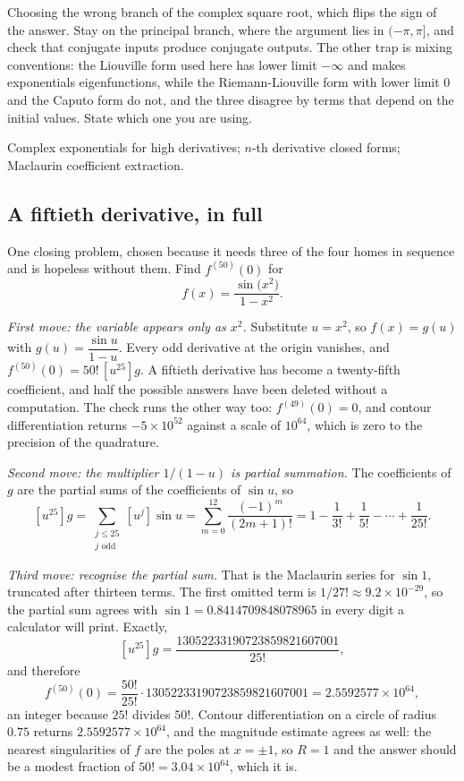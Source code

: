 \begin{trap}
Choosing the wrong branch of the complex square root, which flips the sign of the answer. Stay on the principal branch, where the argument lies in $(-\pi,\pi]$, and check that conjugate inputs produce conjugate outputs. The other trap is mixing conventions: the Liouville form used here has lower limit $-\infty$ and makes exponentials eigenfunctions, while the Riemann-Liouville form with lower limit $0$ and the Caputo form do not, and the three disagree by terms that depend on the initial values. State which one you are using.
\end{trap}

\begin{seealsob}Complex exponentials for high derivatives; $n$-th derivative closed forms; Maclaurin coefficient extraction.\end{seealsob}

\subsection{A fiftieth derivative, in full}

One closing problem, chosen because it needs three of the four homes in sequence and is hopeless without them. Find $f^{(50)}(0)$ for
\[
f(x)=\frac{\sin\bigl(x^{2}\bigr)}{1-x^{2}} .
\]

\emph{First move: the variable appears only as $x^{2}$.} Substitute $u=x^{2}$, so $f(x)=g(u)$ with $g(u)=\dfrac{\sin u}{1-u}$. Every odd derivative at the origin vanishes, and $f^{(50)}(0)=50!\,[u^{25}]g$. A fiftieth derivative has become a twenty-fifth coefficient, and half the possible answers have been deleted without a computation. The check runs the other way too: $f^{(49)}(0)=0$, and contour differentiation returns $-5\times10^{52}$ against a scale of $10^{64}$, which is zero to the precision of the quadrature.

\emph{Second move: the multiplier $1/(1-u)$ is partial summation.} The coefficients of $g$ are the partial sums of the coefficients of $\sin u$, so
\[
[u^{25}]g=\sum_{\substack{j\leq25\\ j\text{ odd}}}[u^{j}]\sin u=\sum_{m=0}^{12}\frac{(-1)^{m}}{(2m+1)!}
=1-\frac{1}{3!}+\frac{1}{5!}-\cdots+\frac{1}{25!} .
\]

\emph{Third move: recognise the partial sum.} That is the Maclaurin series for $\sin1$, truncated after thirteen terms. The first omitted term is $1/27!\approx9.2\times10^{-29}$, so the partial sum agrees with $\sin1=0.8414709848078965$ in every digit a calculator will print. Exactly,
\[
[u^{25}]g=\frac{13052233190723859821607001}{25!},
\]
and therefore
\[
f^{(50)}(0)=\frac{50!}{25!}\cdot13052233190723859821607001=2.5592577\times10^{64},
\]
an integer because $25!$ divides $50!$. Contour differentiation on a circle of radius $0.75$ returns $2.5592577\times10^{64}$, and the magnitude estimate agrees as well: the nearest singularities of $f$ are the poles at $x=\pm1$, so $R=1$ and the answer should be a modest fraction of $50!=3.04\times10^{64}$, which it is.

